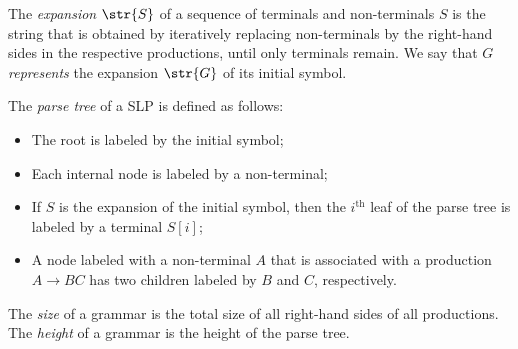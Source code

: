 The \emph{expansion} $\str{S}$ of a sequence of terminals and non-terminals $S$ is the string that is obtained by iteratively replacing non-terminals by the right-hand sides in the respective productions, until only terminals remain. We say that $G$ \emph{represents} the expansion $\str{G}$ of its initial symbol.

\begin{definition}
 The \emph{parse tree} of a SLP is defined as follows: 
\begin{itemize}
\item The root is labeled by the initial symbol;
\item Each internal node is labeled by a non-terminal;
\item If $S$ is the expansion of the initial symbol, then the $i^{\text{th}}$ leaf of the parse tree is labeled by a terminal $S[i]$;
\item A node labeled with a non-terminal $A$ that is associated with a production $A\rightarrow BC$ has two children labeled by $B$ and $C$, respectively.
\end{itemize}
\end{definition}

The \emph{size} of a grammar is the total size of all right-hand sides of all productions. The \emph{height} of a grammar is the height of the parse tree.  

